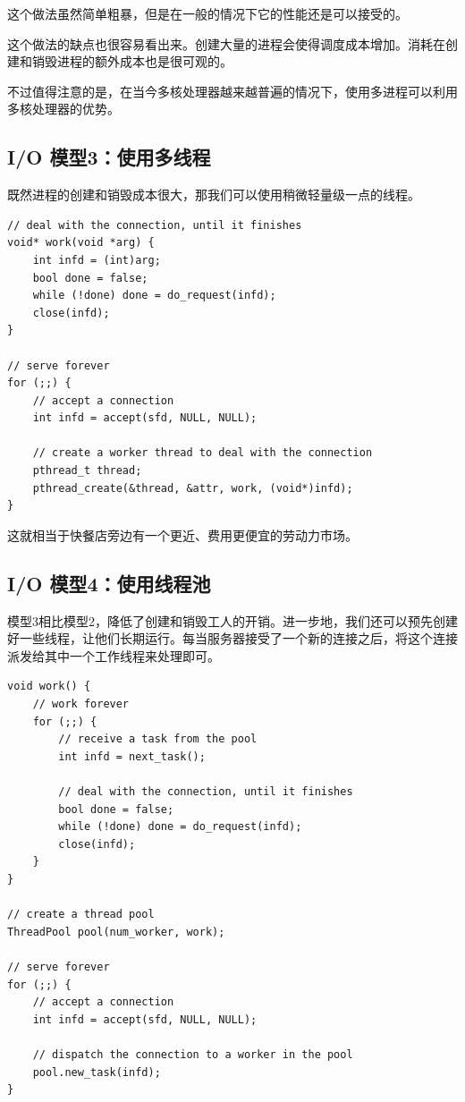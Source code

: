 \documentclass[a4paper]{article}
\begin{document}
这个做法虽然简单粗暴，但是在一般的情况下它的性能还是可以接受的。

这个做法的缺点也很容易看出来。创建大量的进程会使得调度成本增加。消耗在创建和销毁进程的额外成本也是很可观的。

不过值得注意的是，在当今多核处理器越来越普遍的情况下，使用多进程可以利用多核处理器的优势。

\subsection{I/O 模型3：使用多线程}

既然进程的创建和销毁成本很大，那我们可以使用稍微轻量级一点的线程。

\begin{verbatim}
// deal with the connection, until it finishes
void* work(void *arg) {
    int infd = (int)arg;
    bool done = false;
    while (!done) done = do_request(infd);
    close(infd);
}

// serve forever
for (;;) {
    // accept a connection
    int infd = accept(sfd, NULL, NULL);

    // create a worker thread to deal with the connection
    pthread_t thread;
    pthread_create(&thread, &attr, work, (void*)infd);
}
\end{verbatim}

这就相当于快餐店旁边有一个更近、费用更便宜的劳动力市场。

\subsection{I/O 模型4：使用线程池}

模型3相比模型2，降低了创建和销毁工人的开销。进一步地，我们还可以预先创建好一些线程，让他们长期运行。每当服务器接受了一个新的连接之后，将这个连接派发给其中一个工作线程来处理即可。

\begin{verbatim}
void work() {
    // work forever
    for (;;) {
        // receive a task from the pool
        int infd = next_task();

        // deal with the connection, until it finishes
        bool done = false;
        while (!done) done = do_request(infd);
        close(infd);
    }
}

// create a thread pool
ThreadPool pool(num_worker, work);

// serve forever
for (;;) {
    // accept a connection
    int infd = accept(sfd, NULL, NULL);

    // dispatch the connection to a worker in the pool
    pool.new_task(infd);
}
\end{verbatim}
\end{document}
